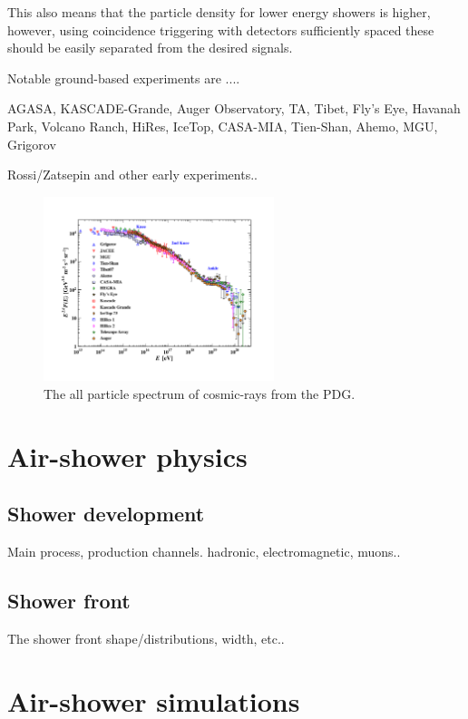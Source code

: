 This also means that the particle density for lower energy showers is higher, however, using coincidence triggering with detectors sufficiently spaced these should be easily separated from the desired signals.

Notable ground-based experiments are ....

AGASA, KASCADE-Grande, Auger Observatory, TA, Tibet, Fly's Eye, Havanah Park, Volcano Ranch, HiRes, IceTop, CASA-MIA, Tien-Shan, Ahemo, MGU, Grigorov

Rossi/Zatsepin and other early experiments..

\begin{figure}
    \centering
    \includegraphics[width=0.6\textwidth]
                    {plots/cosmic-rays/PDG_28_8_all_particle_spectrum}
    \caption{The all particle spectrum of cosmic-rays from the PDG.}
    \label{fig:spectrum}
\end{figure}


\section{Air-shower physics}

\subsection{Shower development}

Main process, production channels. hadronic, electromagnetic, muons..

\subsection{Shower front}

The shower front shape/distributions, width, etc..


\section{Air-shower simulations}

